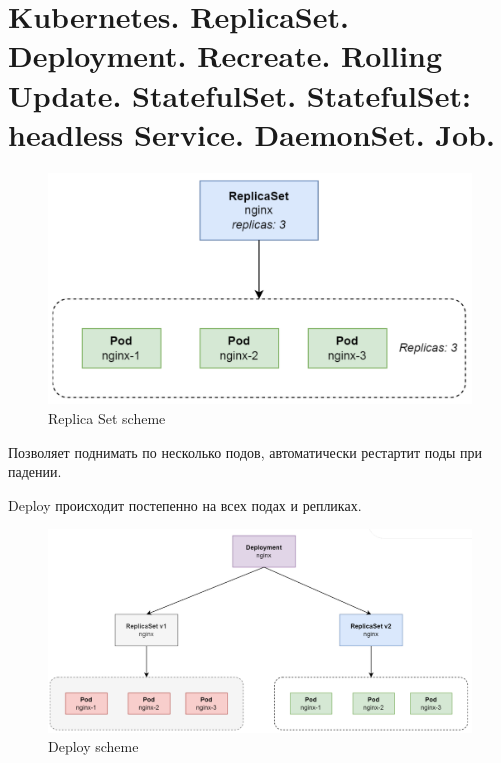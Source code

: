 \section{Kubernetes. ReplicaSet. Deployment. Recreate. Rolling Update. StatefulSet. StatefulSet:
headless Service. DaemonSet. Job.}

\begin{figure}[H]
	\centering
	\begin{minipage}[b]{0.4\textwidth}
		\includegraphics[width=\textwidth]{images/rset.png}
        \caption{Replica Set scheme}
	\end{minipage}
\end{figure}

Позволяет поднимать по несколько подов, автоматически рестартит поды
при падении.

Deploy происходит постепенно на всех подах и репликах.

\begin{figure}[H]
	\centering
	\begin{minipage}[b]{0.4\textwidth}
		\includegraphics[width=\textwidth]{images/kdep.png}
        \caption{Deploy scheme}
	\end{minipage}
\end{figure}


